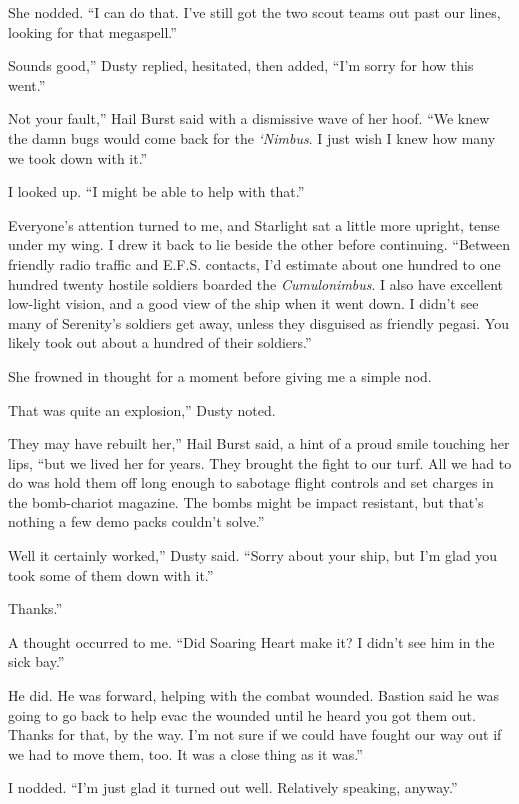 She nodded. “I can do that. I’ve still got the two scout teams out past our lines, looking for that megaspell.”

\leavevmode{}Sounds good,” Dusty replied, hesitated, then added, “I’m sorry for how this went.”

\leavevmode{}Not your fault,” Hail Burst said with a dismissive wave of her hoof. “We knew the damn bugs would come back for the \textit{‘Nimbus}. I just wish I knew how many we took down with it.”

I looked up. “I might be able to help with that.”

Everyone’s attention turned to me, and Starlight sat a little more upright, tense under my wing. I drew it back to lie beside the other before continuing. “Between friendly radio traffic and E.F.S. contacts, I’d estimate about one hundred to one hundred twenty hostile soldiers boarded the \textit{Cumulonimbus}. I also have excellent low-light vision, and a good view of the ship when it went down. I didn’t see many of Serenity’s soldiers get away, unless they disguised as friendly pegasi. You likely took out about a hundred of their soldiers.”

She frowned in thought for a moment before giving me a simple nod.

\leavevmode{}That was quite an explosion,” Dusty noted.

\leavevmode{}They may have rebuilt her,” Hail Burst said, a hint of a proud smile touching her lips, “but we lived her for years. They brought the fight to our turf. All we had to do was hold them off long enough to sabotage flight controls and set charges in the bomb-chariot magazine. The bombs might be impact resistant, but that’s nothing a few demo packs couldn’t solve.”

\leavevmode{}Well it certainly worked,” Dusty said. “Sorry about your ship, but I’m glad you took some of them down with it.”

\leavevmode{}Thanks.”

A thought occurred to me. “Did Soaring Heart make it? I didn’t see him in the sick bay.”

\leavevmode{}He did. He was forward, helping with the combat wounded. Bastion said he was going to go back to help evac the wounded until he heard you got them out. Thanks for that, by the way. I’m not sure if we could have fought our way out if we had to move them, too. It was a close thing as it was.”

I nodded. “I’m just glad it turned out well. Relatively speaking, anyway.”

